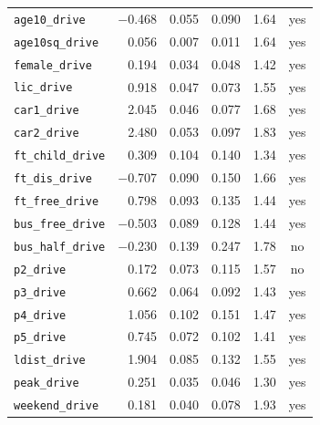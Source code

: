 \begin{longtable}{lrrrrc}
\texttt{age10\_drive} & $-$0.468 & 0.055 & 0.090 & 1.64 & yes \\
\texttt{age10sq\_drive} & 0.056 & 0.007 & 0.011 & 1.64 & yes \\
\texttt{female\_drive} & 0.194 & 0.034 & 0.048 & 1.42 & yes \\
\texttt{lic\_drive} & 0.918 & 0.047 & 0.073 & 1.55 & yes \\
\texttt{car1\_drive} & 2.045 & 0.046 & 0.077 & 1.68 & yes \\
\texttt{car2\_drive} & 2.480 & 0.053 & 0.097 & 1.83 & yes \\
\texttt{ft\_child\_drive} & 0.309 & 0.104 & 0.140 & 1.34 & yes \\
\texttt{ft\_dis\_drive} & $-$0.707 & 0.090 & 0.150 & 1.66 & yes \\
\texttt{ft\_free\_drive} & 0.798 & 0.093 & 0.135 & 1.44 & yes \\
\texttt{bus\_free\_drive} & $-$0.503 & 0.089 & 0.128 & 1.44 & yes \\
\texttt{bus\_half\_drive} & $-$0.230 & 0.139 & 0.247 & 1.78 & no \\
\texttt{p2\_drive} & 0.172 & 0.073 & 0.115 & 1.57 & no \\
\texttt{p3\_drive} & 0.662 & 0.064 & 0.092 & 1.43 & yes \\
\texttt{p4\_drive} & 1.056 & 0.102 & 0.151 & 1.47 & yes \\
\texttt{p5\_drive} & 0.745 & 0.072 & 0.102 & 1.41 & yes \\
\texttt{ldist\_drive} & 1.904 & 0.085 & 0.132 & 1.55 & yes \\
\texttt{peak\_drive} & 0.251 & 0.035 & 0.046 & 1.30 & yes \\
\texttt{weekend\_drive} & 0.181 & 0.040 & 0.078 & 1.93 & yes \\
\bottomrule
\end{longtable}
